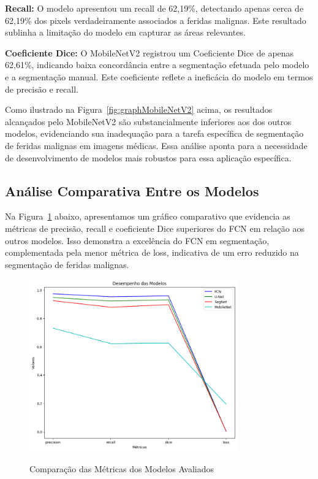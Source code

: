 \textbf{Recall:} O modelo apresentou um recall de 62,19\%, detectando apenas cerca de 62,19\% dos pixels verdadeiramente associados a feridas malignas. Este resultado sublinha a limitação do modelo em capturar as áreas relevantes.

\textbf{Coeficiente Dice:} O MobileNetV2 registrou um Coeficiente Dice de apenas 62,61\%, indicando baixa concordância entre a segmentação efetuada pelo modelo e a segmentação manual. Este coeficiente reflete a ineficácia do modelo em termos de precisão e recall.

Como ilustrado na Figura~\ref{fig:graphMobileNetV2} acima, os resultados alcançados pelo \ac{MobileNetV2} são substancialmente inferiores aos dos outros modelos, evidenciando sua inadequação para a tarefa específica de segmentação de feridas malignas em imagens médicas. Essa análise aponta para a necessidade de desenvolvimento de modelos mais robustos para essa aplicação específica.

\subsection{Análise Comparativa Entre os Modelos}
Na Figura~\ref{fig:graphResultsModels} abaixo, apresentamos um gráfico comparativo que evidencia as métricas de precisão, recall e coeficiente Dice superiores do \ac{FCN} em relação aos outros modelos. Isso demonstra a excelência do \ac{FCN} em segmentação, complementada pela menor métrica de loss, indicativa de um erro reduzido na segmentação de feridas malignas.

\begin{figure}[htbp]
    \centering
    \caption{Comparação das Métricas dos Modelos Avaliados}
    \includegraphics[width=0.8\textwidth]{img/results_metrics_models.png}
    \label{fig:graphResultsModels}
\end{figure}

